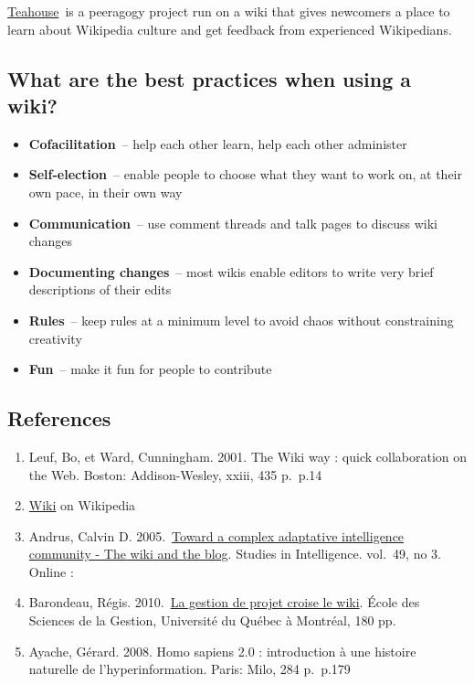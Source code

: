 \href{http://en.wikipedia.org/wiki/Wikipedia:Teahouse}{Teahouse}~is a
peeragogy project run on a wiki that gives newcomers a place to learn
about Wikipedia culture and get feedback from experienced Wikipedians.

\subsection{What are the best practices when using a
wiki?}\label{what-are-the-best-practices-when-using-a-wiki}

\begin{itemize}
\itemsep1pt\parskip0pt
\item
  \textbf{Cofacilitation}~-- help each other learn, help each other
  administer
\item
  \textbf{Self-election}~-- enable people to choose what they want to
  work on, at their own pace, in their own way
\item
  \textbf{Communication}~-- use comment threads and talk pages to
  discuss wiki changes
\item
  \textbf{Documenting changes}~-- most wikis enable editors to write
  very brief descriptions of their edits
\item
  \textbf{Rules}~-- keep rules at a minimum level to avoid chaos without
  constraining creativity
\item
  \textbf{Fun}~-- make it fun for people to contribute
\end{itemize}

\subsection{References}\label{wiki-references}

\begin{enumerate}
\def\labelenumi{\arabic{enumi}.}
\item
  Leuf, Bo, et Ward, Cunningham. 2001. The Wiki way : quick
  collaboration on the Web. Boston: Addison-Wesley, xxiii, 435 p.~p.14
\item
  \href{http://en.wikipedia.org/wiki/Wiki}{Wiki} on Wikipedia
\item
  Andrus, Calvin D. 2005.~\href{http://ssrn.com/abstract=755904}{Toward
  a complex adaptative intelligence community - The wiki and the blog}.
  Studies in Intelligence. vol.~49, no 3. Online :
\item
  Barondeau, Régis.
  2010.~\href{http://www.regisbarondeau.com/Chapitre+4\%3A+Analyse+du+cas\#Synth_se}{La
  gestion de projet croise le wiki}. École des Sciences de la Gestion,
  Université du Québec à Montréal, 180 pp.
\item
  Ayache, Gérard. 2008. Homo sapiens 2.0 : introduction à une histoire
  naturelle de l'hyperinformation. Paris: Milo, 284 p.~p.179
\end{enumerate}
